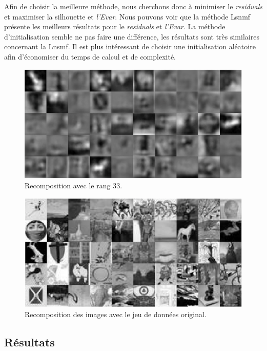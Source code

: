 \documentclass[runningheads]{llncs}
\begin{document}
Afin de choisir la meilleure méthode, nous cherchons donc à minimiser le \textit{residuals} et maximiser la silhouette et \textit{l'Evar}. Nous pouvons voir que la méthode Lsnmf présente les meilleurs résultats pour le \textit{residuals} et \textit{l'Evar}. La méthode d'initialisation semble ne pas faire une différence, les résultats sont très similaires concernant la Lnsmf. Il est plus intéressant de choisir une initialisation aléatoire afin d'économiser du temps de calcul et de complexité.


\begin{figure}[H]
\centering
\includegraphics[width=1\textwidth]{recomposition-lsnmf-33.png}
\caption{Recomposition avec le rang 33.}
  \label{fig:recomposition}
\end{figure}

\begin{figure}[H]
\centering
\includegraphics[width=1\textwidth]{recomposition-original-dataset.png}
\caption{Recomposition des images avec le jeu de données original.}
  \label{fig:recomposition}
\end{figure}
\newpage

\subsection{Résultats}
\end{document}
